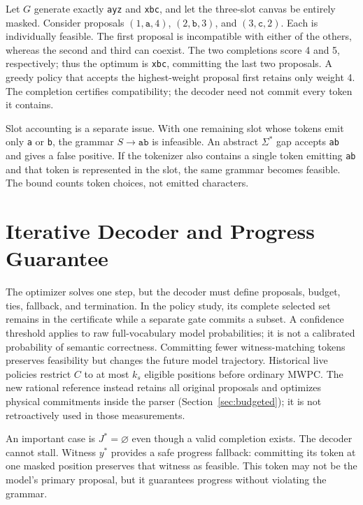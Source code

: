 Let $G$ generate exactly \texttt{ayz} and \texttt{xbc}, and let the three-slot canvas be entirely masked. Consider proposals $(1,\mathtt{a},4)$, $(2,\mathtt{b},3)$, and $(3,\mathtt{c},2)$. Each is individually feasible. The first proposal is incompatible with either of the others, whereas the second and third can coexist. The two completions score 4 and 5, respectively; thus the optimum is \texttt{xbc}, committing the last two proposals. A greedy policy that accepts the highest-weight proposal first retains only weight 4. The completion certifies compatibility; the decoder need not commit every token it contains.

Slot accounting is a separate issue. With one remaining slot whose tokens emit only \texttt{a} or \texttt{b}, the grammar $S\rightarrow\mathtt{a}\mathtt{b}$ is infeasible. An abstract $\Sigma^*$ gap accepts \texttt{ab} and gives a false positive. If the tokenizer also contains a single token emitting \texttt{ab} and that token is represented in the slot, the same grammar becomes feasible. The bound counts token choices, not emitted characters.

\section{Iterative Decoder and Progress Guarantee}
\label{sec:decoder}

The optimizer solves one step, but the decoder must define proposals, budget, ties, fallback, and termination. In the policy study, its complete selected set remains in the certificate while a separate gate commits a subset. A confidence threshold applies to raw full-vocabulary model probabilities; it is not a calibrated probability of semantic correctness. Committing fewer witness-matching tokens preserves feasibility but changes the future model trajectory. Historical live policies restrict $C$ to at most $k_s$ eligible positions before ordinary MWPC. The new rational reference instead retains all original proposals and optimizes physical commitments inside the parser (Section~\ref{sec:budgeted}); it is not retroactively used in those measurements.

An important case is $J^*=\varnothing$ even though a valid completion exists. The decoder cannot stall. Witness $y^*$ provides a safe progress fallback: committing its token at one masked position preserves that witness as feasible. This token may not be the model's primary proposal, but it guarantees progress without violating the grammar.



